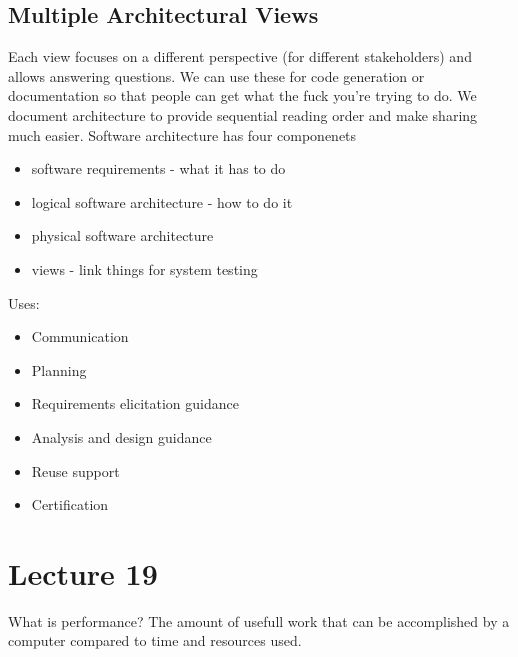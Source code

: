\documentclass{article}
\begin{document}
\subsection*{Multiple Architectural Views} %
\label{sub:multiple_architectural_views}
Each view focuses on a different perspective (for different stakeholders) and allows answering questions. We can use these for code generation or documentation so that people can get what the fuck you're trying to do. We document architecture to provide sequential reading order and make sharing much easier. Software architecture has four componenets
\begin{itemize}
    \item software requirements - what it has to do
    \item logical software architecture - how to do it
    \item physical software architecture
    \item views - link things for system testing
\end{itemize}
Uses:
\begin{itemize}
    \item  Communication
    \item Planning
    \item Requirements elicitation guidance
    \item Analysis and design guidance
    \item Reuse support
    \item Certification
\end{itemize}



\section*{Lecture 19} %
\label{sec:lecture_19}
What is performance? The amount of usefull work that can be accomplished by a computer compared to time and resources used.
\end{document}
